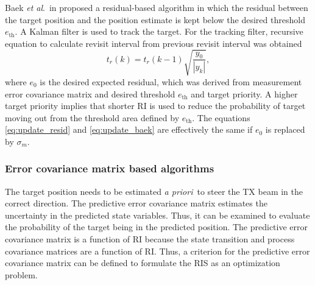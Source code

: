 \documentclass[english, 12pt, a4paper, elec, utf8, a-1b, online]{aaltothesis}
\newcommand{\etal}{\textit{et al}.~}
\def\prior{\textit{a priori}\ }
\newcommand{\ri}{t_r}
\begin{document}
Baek \etal in \cite{Baek2010} proposed a residual-based algorithm in which the residual between the target position and the position estimate is kept below the desired threshold $e_\text{th}$.
A Kalman filter is used to track the target.
For the tracking filter, recursive equation to calculate revisit interval from previous revisit interval was obtained
\begin{equation}\label{eq:update_baek}
    \ri(k) = \ri(k - 1) \sqrt{\frac{y_0}{|y_k|}},
\end{equation}
where $e_0$ is the desired expected residual, which was derived from measurement error covariance matrix and desired threshold $e_\text{th}$ and target priority.
A higher target priority implies that shorter RI is used to reduce the probability of target moving out from the threshold area defined by $e_\text{th}$.
The equations \eqref{eq:update_resid} and \eqref{eq:update_baek} are effectively the same if $e_0$ is replaced by $\sigma_m$.


\subsubsection{Error covariance matrix based algorithms}

\newcommand{\ndwells}{{n_d}}


The target position needs to be estimated \prior to steer the TX beam in the correct direction. 
The predictive error covariance matrix estimates the uncertainty in the predicted state variables.
Thus, it can be examined to evaluate the probability of the target being in the predicted position.
The predictive error covariance matrix is a function of RI because the state transition and process covariance matrices are a function of RI.
Thus, a criterion for the predictive error covariance matrix can be defined to formulate the RIS as an optimization problem.
\end{document}

